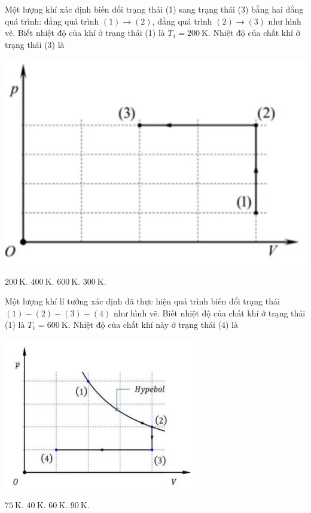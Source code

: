 \begin{ex}
	Một lượng khí xác định biến đổi trạng thái (1) sang trạng thái (3) bằng hai đẳng quá trình: đẳng quá trình $(1)\rightarrow(2)$, đẳng quá trình $(2)\rightarrow(3)$ như hình vẽ. Biết nhiệt độ của khí ở trạng thái (1) là $T_1=\SI{200}{\kelvin}$. Nhiệt độ của chất khí ở trạng thái (3) là
	\begin{center}
		\includegraphics[width=0.3\linewidth]{figs/VN12-Y24-PH-SYL-014P-1}
	\end{center}
	\choice
	{$\SI{200}{\kelvin}$.}
	{\True $\SI{400}{\kelvin}$.}
	{$\SI{600}{\kelvin}$.}
	{$\SI{300}{\kelvin}$.}
\end{ex}
\begin{ex}
Một lượng khí lí tưởng xác định đã thực hiện quá trình biến đổi trạng thái $(1)-(2)-(3)-(4)$ như hình vẽ. Biết nhiệt độ của chất khí ở trạng thái (1) là $T_1=\SI{600}{\kelvin}$. Nhiệt độ của chất khí này ở trạng thái (4) là
\begin{center}
	\includegraphics[width=0.35\linewidth]{figs/VN12-Y24-PH-SYL-014P-3}
\end{center}
	\choice
	{\True $\SI{75}{\kelvin}$.}
	{$\SI{40}{\kelvin}$.}
	{$\SI{60}{\kelvin}$.}
	{$\SI{90}{\kelvin}$.}
\end{ex}

